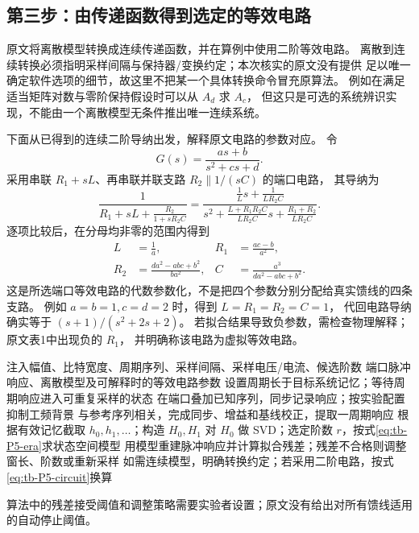 \documentclass[UTF8,11pt,fontset=fandol,openany,oneside]{ctexbook}
\theoremstyle{definition}
\theoremstyle{remark}
\numberwithin{equation}{chapter}
\begin{document}
\subsection{第三步：由传递函数得到选定的等效电路}
原文将离散模型转换成连续传递函数，并在算例中使用二阶等效电路。
离散到连续转换必须指明采样间隔与保持器/变换约定；本次核实的原文没有提供
足以唯一确定软件选项的细节，故这里不把某一个具体转换命令冒充原算法。
例如在满足适当矩阵对数与零阶保持假设时可以从 $A_d$ 求 $A_c$，
但这只是可选的系统辨识实现，不能由一个离散模型无条件推出唯一连续系统。

下面从已得到的连续二阶导纳出发，解释原文电路的参数对应。
令
\[
 G(s)=\frac{as+b}{s^2+cs+d}.
\]
采用串联 $R_1+sL$、再串联并联支路 $R_2\parallel1/(sC)$ 的端口电路，
其导纳为
\[
 \frac1{R_1+sL+\frac{R_2}{1+sR_2C}}
 =
 \frac{\frac1L s+\frac1{LR_2C}}
 {s^2+\frac{L+R_1R_2C}{LR_2C}s+\frac{R_1+R_2}{LR_2C}}.
\]
逐项比较后，在分母均非零的范围内得到
\begin{equation}\label{eq:tb-P5-circuit}
 \begin{aligned}
 L&=\frac1a,&
 R_1&=\frac{ac-b}{a^2},\\
 R_2&=\frac{da^2-abc+b^2}{ba^2},&
 C&=\frac{a^3}{da^2-abc+b^2}.
 \end{aligned}
\end{equation}
这是所选端口等效电路的代数参数化，不是把四个参数分别分配给真实馈线的四条支路。
例如 $a=b=1,c=d=2$ 时，得到 $L=R_1=R_2=C=1$，
代回电路导纳确实等于 $(s+1)/(s^2+2s+2)$。
若拟合结果导致负参数，需检查物理解释；原文表1中出现负的 $R_1$，
并明确称该电路为虚拟等效电路。

\begin{algorithm}[htbp]
\caption{P5 的脉冲压缩到端口模型主线}
\label{alg:tb-P5}
\begin{algorithmic}[1]
\Require 注入幅值、比特宽度、周期序列、采样间隔、采样电压/电流、候选阶数
\Ensure 端口脉冲响应、离散模型及可解释时的等效电路参数
\State 设置周期长于目标系统记忆；等待周期响应进入可重复采样的状态
\State 在端口叠加已知序列，同步记录响应；按实验配置抑制工频背景
\State 与参考序列相关，完成同步、增益和基线校正，提取一周期响应
\State 根据有效记忆截取 $h_0,h_1,\ldots$；构造 $H_0,H_1$
\State 对 $H_0$ 做 SVD；选定阶数 $r$，按式\eqref{eq:tb-P5-era}求状态空间模型
\State 用模型重建脉冲响应并计算拟合残差；残差不合格则调整窗长、阶数或重新采样
\State 如需连续模型，明确转换约定；若采用二阶电路，按式\eqref{eq:tb-P5-circuit}换算
\end{algorithmic}
\end{algorithm}
算法中的残差接受阈值和调整策略需要实验者设置；原文没有给出对所有馈线适用的自动停止阈值。
\end{document}
